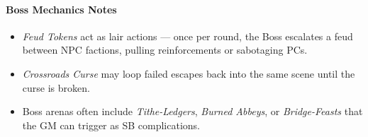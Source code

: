 \paragraph{Boss Mechanics Notes}
\begin{itemize}
  \item \emph{Feud Tokens} act as lair actions — once per round, the Boss escalates a feud between NPC factions, pulling reinforcements or sabotaging PCs. 
  \item \emph{Crossroads Curse} may loop failed escapes back into the same scene until the curse is broken. 
  \item Boss arenas often include \emph{Tithe-Ledgers}, \emph{Burned Abbeys}, or \emph{Bridge-Feasts} that the GM can trigger as SB complications. 
\end{itemize}